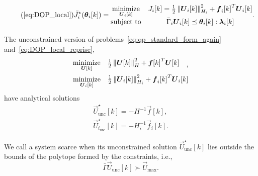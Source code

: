 \documentclass[../main.tex]{subfiles}
\begin{document}
\begin{equation}
  \label{eq:DOP_local_reprise}
  \tag{\ref*{eq:DOP_local}}
  \bar{J}_{i}^{\star}(\thetaik)=
  \begin{matrix}
    \underset{\vec{U}_{i}[k]}{\mathrm{minimize}}&\obji=\frac{1}{2}\norm{\vec{U}_{i}[k]}^{2}_{H_{i}} + {\vec{f}_{i}[k]}^{T}\vec{U}_{i}[k]\\
    \mathrm{subject~ to} & \bar{\Gamma}_{i}\vec{U}_{i}[k] \preceq \thetaik:\lambdaik
  \end{matrix}.
\end{equation}

The unconstrained version of problems~\eqref{eq:qp_standard_form_again} and~\eqref{eq:DOP_local_reprise},
\begin{align}
  \label{eq:qp_standard_form_unconstrained}
  \begin{aligned}
    \begin{matrix}
      \underset{\boldsymbol{U}[k]}{\mathrm{minimize}} &
                                                 \frac{1}{2}\left\lVert\boldsymbol{U}[k]\right\rVert^{2}_{H} + {\boldsymbol{f}[k]}^{T}\boldsymbol{U}[k] &\\
    \end{matrix},
  \end{aligned}\\
  \label{eq:DOP_local_unconstrained}
  \begin{aligned}
    \begin{matrix}
    \underset{\boldsymbol{U}_{i}[k]}{\mathrm{minimize}}&\frac{1}{2}\left\lVert\boldsymbol{U}_{i}[k]\right\rVert^{2}_{H_{i}} + {\boldsymbol{f}_{i}[k]}^{T}\boldsymbol{U}_{i}[k]\\
    \end{matrix}
  \end{aligned}
\end{align}
have analytical solutions~\cite{BoydVandenberghe2004}
\begin{align}
  \label{eq:qp_standard_form_unconstrained_solution}
  \vec{U}_{\text{unc}}^{\star}[k]=-H^{-1}\vec{f}[k],\\
  \label{eq:DOP_local_unconstrained_solution}
  \vec{U}_{i_{\text{unc}}}^{\star}[k]=-H_{i}^{-1}\vec{f}_{i}[k].
\end{align}

We call a system scarce when its unconstrained solution $\vec{U}_{\text{unc}}^{\star}[k]$ lies outside the bounds of the polytope formed by the constraints, i.e.,
\begin{equation}
\bar{\Gamma}\vec{U}_{\text{unc}}[k]\succ {\vec{U}}_{\text{max}}.
\end{equation}
\end{document}
